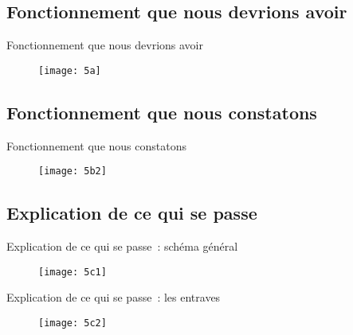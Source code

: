 \documentclass[11pt,xcolor=dvipsname,ignorenonframetext,handout]{beamer}
\begin{document}
\subsection{Fonctionnement que nous devrions avoir}
\begin{frame}{Fonctionnement que nous devrions avoir}
\rightskip=0pt\leftskip=0pt
    {
  \begin{figure}
    \centering
    \texttt{[image: 5a]}
  \end{figure}
    }
\end{frame}
\subsection{Fonctionnement que nous constatons}
\begin{frame}{Fonctionnement que nous constatons}
    \rightskip=0pt\leftskip=0pt
    {
  \begin{figure}
    \centering
    \texttt{[image: 5b2]}
  \end{figure}
    }
\end{frame}
\subsection{Explication de ce qui se passe}
\begin{frame}{Explication de ce qui se passe~: schéma général}
      \rightskip=0pt\leftskip=0pt
    {
  \begin{figure}
    \centering
    \texttt{[image: 5c1]}
  \end{figure}
    }
\end{frame}
\begin{frame}{Explication de ce qui se passe~: les entraves}
      \rightskip=0pt\leftskip=0pt
    {
  \begin{figure}
    \centering
    \texttt{[image: 5c2]}
  \end{figure}
    }
\end{frame}
\end{document}
